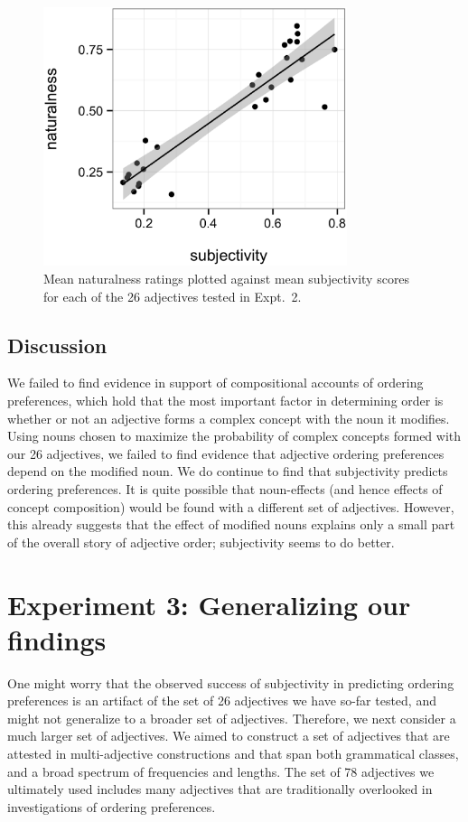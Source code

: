 \documentclass[12pt]{article}
\begin{document}
\begin{figure}
	\centering\includegraphics[width=3.5in]{plots/naturalness-subjectivity-new-nouns.eps}
	\caption{Mean naturalness ratings plotted against mean subjectivity scores for each of the 26 adjectives tested in Expt.~2.}\label{fig:subjectivity}
\end{figure}

\subsection{Discussion}

We  failed to find evidence in support of compositional accounts of ordering preferences, which hold that the most important factor in determining order is whether or not an adjective forms a complex concept with the noun it modifies. Using nouns chosen to maximize the probability of complex concepts formed with our 26 adjectives, we failed to find evidence that adjective ordering preferences depend on the modified noun. We do continue to find that subjectivity predicts ordering preferences.
It is quite possible that noun-effects (and hence effects of concept composition) would be found with a different set of adjectives. 
However, this already suggests that the effect of modified nouns explains only a small part of the overall story of adjective order; subjectivity seems to do better.

\section{Experiment 3: Generalizing our findings}

One might worry that the observed success of subjectivity in predicting ordering preferences is an artifact of the set of 26 adjectives we have so-far tested, and might not generalize to a broader set of adjectives. Therefore, we next consider a much larger set of adjectives. 
We aimed to construct a set of adjectives that are attested in multi-adjective constructions and that span both grammatical classes, and a broad spectrum of frequencies and lengths.  
The set of 78 adjectives we ultimately used includes many adjectives that are traditionally overlooked in investigations of ordering preferences.
\end{document}
